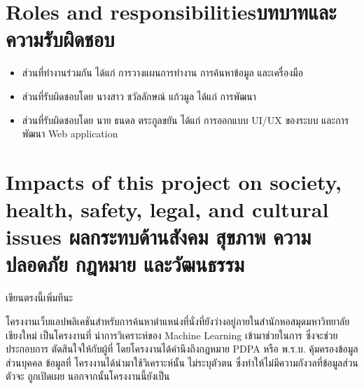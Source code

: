 \section{\ifenglish Roles and responsibilities\else บทบาทและความรับผิดชอบ\fi}
\begin{itemize}
\item ส่วนที่ทำงานร่วมกัน ได้แก่ การวางแผนการทำงาน การค้นหาข้อมูล และเครื่องมือ
\item ส่วนที่รับผิดชอบโดย นางสาว ชวัลลักษณ์ แก้วมูล ได้แก่ การพัฒนา
\item ส่วนที่รับผิดชอบโดย นาย ธนดล ตระกูลขยัน ได้แก่ การออกแบบ UI/UX ของระบบ และการพัฒนา Web application
\end{itemize}
\section{\ifenglish%
Impacts of this project on society, health, safety, legal, and cultural issues
\else%
ผลกระทบด้านสังคม สุขภาพ ความปลอดภัย กฎหมาย และวัฒนธรรม
\fi}
เขียนตรงนี้เพิ่มทีนะ

โครงงานเว็บแอปพลิเคชันสำหรับการค้นหาตำแหน่งที่นั่งที่ยังว่างอยู่ภายในสำนักหอสมุดมหาวิทยาลัยเชียงใหม่ เป็นโครงงานที่
นำการวิเคราะห์ของ Machine Learning เข้ามาช่วยในการ   ซึ่งจะช่วยประกอบการ
ตัดสินใจให้กับผู้ที่ โดยโครงงานได้คำนึงถึงกฎหมาย PDPA หรือ พ.ร.บ. คุ้มครองข้อมูลส่วนบุคคล ข้อมูลที่
โครงงานได้นำมาใช้วิเคราะห์นั้น 
ไม่ระบุตัวตน ซึ่งทำให้ไม่มีความกังวลที่ข้อมูลส่วนตัวจะ
ถูกเปิดเผย นอกจากนั้นโครงงานนี้ยังเป็น
